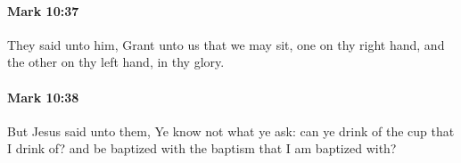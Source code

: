 		\paragraph{Mark 10:37} %
			\label{MARK-10-37}

			They said unto him, Grant unto us that we may sit, one on thy right hand, and the other on thy left hand, in thy glory.

			\begin{framed}
			\scriptsize
				\begin{compactdesc}
					\item[SBLG] 
				\end{compactdesc}
			\end{framed}

		\paragraph{Mark 10:38} %
			\label{MARK-10-38}

			But Jesus said unto them, Ye know not what ye ask: can ye drink of the cup that I drink of? and be baptized with the baptism that I am baptized with?

